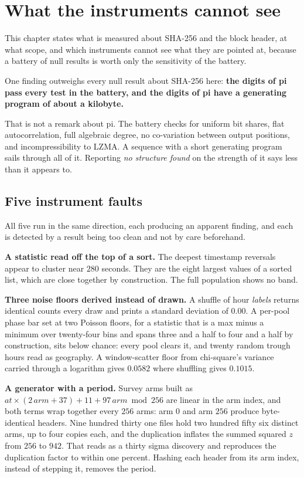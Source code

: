 \chapter{What the instruments cannot see}

This chapter states what is measured about SHA-256 and the block header, at what scope, and which instruments cannot see what they are pointed at, because a battery of null results is worth only the sensitivity of the battery.

One finding outweighs every null result about SHA-256 here: \textbf{the digits of pi pass every test in the battery, and the digits of pi have a generating program of about a kilobyte.}

That is not a remark about pi. The battery checks for uniform bit shares, flat autocorrelation, full algebraic degree, no co-variation between output positions, and incompressibility to LZMA. A sequence with a short generating program sails through all of it. Reporting \emph{no structure found} on the strength of it says less than it appears to.

\section{Five instrument faults}

All five run in the same direction, each producing an apparent finding, and each is detected by a result being too clean and not by care beforehand.

\textbf{A statistic read off the top of a sort.} The deepest timestamp reversals appear to cluster near \(280\) seconds. They are the eight largest values of a sorted list, which are close together by construction. The full population shows no band.

\textbf{Three noise floors derived instead of drawn.} A shuffle of hour \emph{labels} returns identical counts every draw and prints a standard deviation of \(0.00\). A per-pool phase bar set at two Poisson floors, for a statistic that is a max minus a minimum over twenty-four bins and spans three and a half to four and a half by construction, sits below chance: every pool clears it, and twenty random trough hours read as geography. A window-scatter floor from chi-square's variance carried through a logarithm gives \(0.0582\) where shuffling gives \(0.1015\).

\textbf{A generator with a period.} Survey arms built as \(\mathit{at} \times (2\,\mathit{arm} + 37) + 11 + 97\,\mathit{arm} \bmod 256\) are linear in the arm index, and both terms wrap together every \(256\) arms: arm \(0\) and arm \(256\) produce byte-identical headers. Nine hundred thirty one files hold two hundred fifty six distinct arms, up to four copies each, and the duplication inflates the summed squared \(z\) from \(256\) to \(942\). That reads as a thirty sigma discovery and reproduces the duplication factor to within one percent. Hashing each header from its arm index, instead of stepping it, removes the period.

